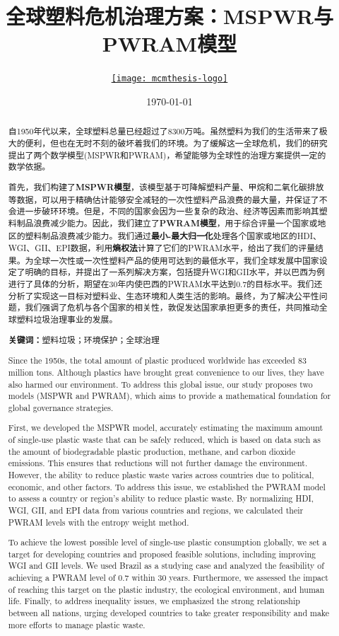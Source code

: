\documentclass[UTF8, fontset=windows]{mcmthesis}
\title{\textbf{全球塑料危机治理方案：MSPWR与PWRAM模型}}
\author{\small \href{https://www.latexstudio.net/}
  {\texttt{[image: mcmthesis-logo]}}}
\date{\today}
\begin{document}
\begin{abstract}
\par 自1950年代以来，全球塑料总量已经超过了8300万吨。虽然塑料为我们的生活带来了极大的便利，但也在无时不刻的破坏着我们的环境。为了缓解这一全球危机，我们的研究提出了两个数学模型(MSPWR和PWRAM)，希望能够为全球性的治理方案提供一定的数学依据。

首先，我们构建了\textbf{MSPWR模型}，该模型基于可降解塑料产量、甲烷和二氧化碳排放等数据，可以用于精确估计能够安全减轻的一次性塑料产品浪费的最大量，并保证了不会进一步破环环境。但是，不同的国家会因为一些复杂的政治、经济等因素而影响其塑料制品浪费减少能力。因此，我们建立了\textbf{PWRAM模型}，用于综合评量一个国家或地区的塑料制品浪费减少能力。我们通过\textbf{最小-最大归一化}处理各个国家或地区的HDI、WGI、GII、EPI数据，利用\textbf{熵权法}计算了它们的PWRAM水平，给出了我们的评量结果。为全球一次性或一次性塑料产品的使用可达到的最低水平，我们全球发展中国家设定了明确的目标，并提出了一系列解决方案，包括提升WGI和GII水平，并以巴西为例进行了具体的分析，期望在30年内使巴西的PWRAM水平达到0.7的目标水平。我们还分析了实现这一目标对塑料业、生态环境和人类生活的影响。最终，为了解决公平性问题，我们强调了危机与各个国家的相关性，敦促发达国家承担更多的责任，共同推动全球塑料垃圾治理事业的发展。

\textbf{关键词：}塑料垃圾；环境保护；全球治理

Since the 1950s, the total amount of plastic produced worldwide has exceeded 83 million tons. Although plastics have brought great convenience to our lives, they have also harmed our environment. To address this global issue, our study proposes two models (MSPWR and PWRAM), which aims to provide a mathematical foundation for global governance strategies.

First, we developed the MSPWR model, accurately estimating the maximum amount of single-use plastic waste that can be safely reduced, which is based on data such as the amount of biodegradable plastic production, methane, and carbon dioxide emissions. This ensures that reductions will not further damage the environment. However, the ability to reduce plastic waste varies across countries due to political, economic, and other factors. To address this issue, we established the PWRAM model to assess a country or region’s ability to reduce plastic waste. By normalizing HDI, WGI, GII, and EPI data from various countries and regions, we calculated their PWRAM levels with the entropy weight method.

To achieve the lowest possible level of single-use plastic consumption globally, we set a target for developing countries and proposed feasible solutions, including improving WGI and GII levels. We used Brazil as a studying case and analyzed the feasibility of achieving a PWRAM level of 0.7 within 30 years. Furthermore, we assessed the impact of reaching this target on the plastic industry, the ecological environment, and human life. Finally, to address inequality issues, we emphasized the strong relationship between all nations, urging developed countries to take greater responsibility and make more efforts to manage plastic waste.


\end{abstract}
\end{document}
